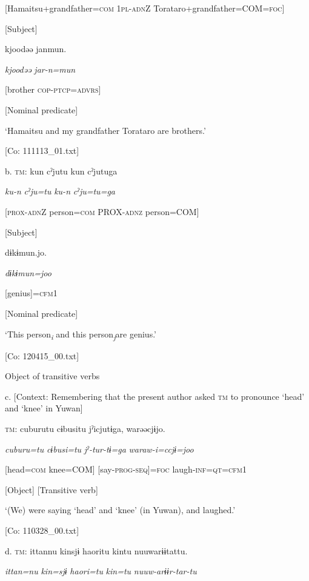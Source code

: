       [Hamaitsu+grandfather=\textsc{com}  1\textsc{pl}-\textsc{adn}Z  Torataro+grandfather=COM=\textsc{foc}]

      [Subject]

      kjoodəə  janmun.

      \textit{kjoodəə}  \textit{jar-n=mun}

      [brother  \textsc{cop}-\textsc{ptcp}=\textsc{advrs}]

      [Nominal predicate]

      ‘Hamaitsu and my grandfather Torataro are brothers.’

      [Co: 111113\_01.txt]

  b.  \textsc{tm}:  kun  cˀjutu  kun  cˀjutuga

      \textit{ku-n}  \textit{cˀju=tu}  \textit{ku-n}  \textit{cˀju=tu=ga}

      [\textsc{prox}-\textsc{adn}Z  person=\textsc{com}  PROX-\textsc{adnz}  person=COM]

      [Subject]

      dɨkɨmun.jo.

      \textit{dɨkɨmun=joo}

      [genius]=\textsc{cfm}1

      [Nominal predicate]

      ‘This person\textit{\textsubscript{i}} and this person\textit{\textsubscript{j}}are genius.’

      [Co: 120415\_00.txt]

  Object of transitive verbs

  c.  [Context: Remembering that the present author asked \textsc{tm} to pronounce ‘head’ and ‘knee’ in Yuwan]

    \textsc{tm}:  cuburutu  cɨbusitu  jˀicjutɨga,  warəəcjɨjo.

      \textit{cuburu=tu}  \textit{cɨbusi=tu}  \textit{jˀ-tur-tɨ=ga}  \textit{waraw-i=ccjɨ=joo}

      [head=\textsc{com}  knee=COM]  [say-\textsc{prog}-\textsc{seq}]=\textsc{foc}  laugh-\textsc{inf}=\textsc{qt}=\textsc{cfm}1

      [Object]  [Transitive verb]  

      ‘(We) were saying ‘head’ and ‘knee’ (in Yuwan), and laughed.’

      [Co: 110328\_00.txt]

  d.  \textsc{tm}:  ittannu  kinsjɨ  {\textbar}haori{\textbar}tu  kintu  nuuwarɨɨtattu.

      \textit{ittan=nu}  \textit{kin=sjɨ}  \textit{haori=tu}  \textit{kin=tu}  \textit{nuuw-arɨɨr-tar-tu}

